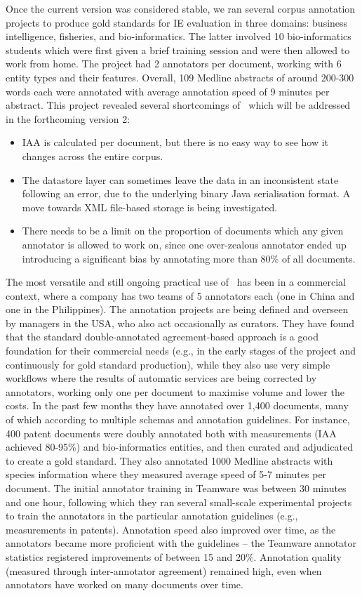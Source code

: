Once the current version was considered stable, we ran several corpus annotation projects to produce gold standards for IE evaluation in three domains: business intelligence, fisheries, and bio-informatics. The latter involved 10 bio-informatics students which were first given a brief training session and were then allowed to work from home. The project had 2 annotators per document, working with 6 entity types and their features. Overall, 109 Medline abstracts of around 200-300 words each were annotated with average annotation speed of 9 minutes per abstract. This project revealed several shortcomings of \teamware\ which will be addressed in the forthcoming version 2: 
\begin{itemize}
  \item  IAA is calculated per document, but there is no easy way to see how it changes across the entire corpus. 
  \item The datastore layer can sometimes leave the data in an inconsistent state following an error, due to the underlying binary Java serialisation format. A move towards XML file-based storage is being investigated.
  \item There needs to be a limit on the proportion of documents which any given annotator is allowed to work on, since one over-zealous annotator ended up introducing a significant bias by annotating more than 80\% of all documents. 
\end{itemize}    

The most versatile and still ongoing practical use of \teamware\ has been in a commercial context, where a company has two teams of 5 annotators each (one in China and one in the Philippines). The annotation projects are being defined and overseen by managers in the USA, who also act occasionally as curators. They have found that the standard double-annotated agreement-based approach is a good foundation for their commercial needs (e.g., in the early stages of the project and continuously for gold standard production), while they also use very simple workflows where the results of automatic services are being corrected by annotators, working only one per document to maximise volume and lower the costs. In the past few months they have annotated over 1,400 documents, many of which according to multiple schemas and annotation guidelines. For instance, 400 patent documents were doubly annotated both with measurements (IAA achieved 80-95\%) and bio-informatics entities, and then curated and adjudicated to create a gold standard. They also annotated 1000 Medline abstracts with species information where they measured average speed of 5-7 minutes per document. The initial annotator training in Teamware was between 30 minutes and one hour, following which they ran several small-scale experimental projects to train the annotators in the particular annotation guidelines (e.g., measurements in patents). Annotation speed also improved over time, as the annotators became more proficient with the guidelines -- the Teamware annotator statistics registered improvements of between 15 and 20\%. Annotation quality (measured through inter-annotator agreement) remained high, even when annotators have worked on many documents over time. 

